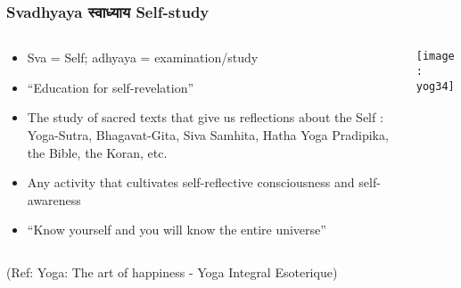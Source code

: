 \begin{frame}[fragile]\frametitle{Svadhyaya स्वाध्याय   Self-study}
   \begin{columns}
    \begin{column}[t]{0.7\linewidth}
	
	\begin{itemize}
	\item Sva = Self; adhyaya = examination/study
	\item ``Education for self-revelation'' 
	\item The study of sacred texts that give us reflections about the Self : Yoga-Sutra, Bhagavat-Gita, Siva Samhita, Hatha Yoga Pradipika, the Bible, the Koran, etc.
	\item Any activity that cultivates self-reflective consciousness  and self-awareness 
	\item ``Know yourself and you will know the entire  universe''

	\end{itemize}
	    \end{column}
    \begin{column}[t]{0.3\linewidth}
\begin{center}
\texttt{[image: yog34]}

\end{center}
    \end{column}
  \end{columns}
  
  \tiny{(Ref: Yoga: The art of happiness - Yoga Integral Esoterique)}

\end{frame}

